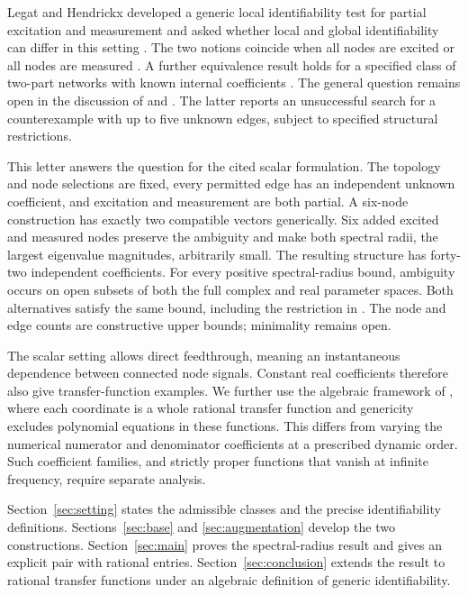 \documentclass[letterpaper,10pt,conference]{ieeeconf}
\begin{document}
Legat and Hendrickx developed a generic local identifiability test for
partial excitation and measurement and asked whether local and global
identifiability can differ in this setting \cite{LH20}. The two notions
coincide when all nodes are excited or all nodes are measured
\cite{LH24}. A further equivalence result holds for a specified class
of two-part networks with known internal coefficients \cite{LH23}.
The general question remains open in the
discussion of \cite[Sec.~II-C]{LH24} and
\cite[Sec.~12.2]{L25}. The latter reports an unsuccessful search for a
counterexample with up to five unknown edges, subject to specified
structural restrictions.

This letter answers the question for the cited scalar formulation.
The topology and node selections are fixed, every permitted edge
has an independent unknown coefficient, and excitation and measurement
are both partial. A six-node construction has exactly two compatible
vectors generically. Six added excited and measured nodes preserve the
ambiguity and make both spectral radii, the largest eigenvalue
magnitudes, arbitrarily small. The resulting structure has forty-two
independent coefficients. For every positive spectral-radius bound,
ambiguity occurs on open subsets of both the full complex and real
parameter spaces. Both alternatives satisfy the same bound, including
the restriction in \cite{LH24}. The node and edge counts are
constructive upper bounds; minimality remains open.

The scalar setting allows direct feedthrough, meaning an instantaneous
dependence between connected node signals. Constant real coefficients
therefore also give transfer-function examples. We further use the
algebraic framework of \cite{HMA26}, where each coordinate is a whole
rational transfer function and genericity excludes polynomial equations
in these functions. This differs from varying the numerical numerator
and denominator coefficients at a prescribed dynamic order.
Such coefficient families, and strictly proper functions that vanish
at infinite frequency, require separate analysis.

Section~\ref{sec:setting} states the admissible classes and the precise
identifiability definitions. Sections~\ref{sec:base} and
\ref{sec:augmentation} develop the two constructions.
Section~\ref{sec:main} proves the spectral-radius result and gives an
explicit pair with rational entries. Section~\ref{sec:conclusion} extends the result
to rational transfer functions under an algebraic definition of generic
identifiability.
\end{document}
